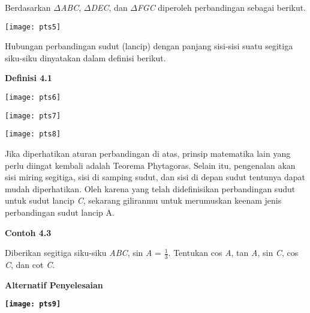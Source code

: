\documentclass[11pt,fleqn]{book} %
\begin{document}
\begin{myEnumerate}
\begin{itemize}
\noindent 

\noindent Berdasarkan $\Delta$\textit{ABC}, $\Delta$\textit{DEC}, dan $\Delta$\textit{FGC }diperoleh perbandingan sebagai berikut.

\noindent 

\noindent \texttt{[image: pts5]}

\noindent 

\noindent Hubungan perbandingan sudut (lancip) dengan panjang sisi-sisi suatu segitiga siku-siku dinyatakan dalam definisi berikut.

\noindent 

\noindent 

\noindent \textbf{Definisi 4.1}

\noindent \textbf{}

\noindent \texttt{[image: pts6]} 

\noindent \texttt{[image: pts7]}

\noindent \texttt{[image: pts8]}

\noindent 

\noindent Jika diperhatikan aturan perbandingan di atas, prinsip matematika lain yang perlu diingat kembali adalah Teorema Phytagoras. Selain itu, pengenalan akan sisi miring segitiga, sisi di samping sudut, dan sisi di depan sudut tentunya dapat mudah diperhatikan. Oleh karena yang telah didefinisikan perbandingan sudut untuk sudut lancip \textit{C}, sekarang giliranmu untuk merumuskan keenam jenis perbandingan sudut lancip A.

\noindent 

\noindent 

\noindent 

\noindent 

\noindent 

\noindent \textbf{Contoh 4.3}

\noindent 

\noindent Diberikan segitiga siku-siku \textit{ABC}, sin \textit{A }= $\frac{1}{3}$. Tentukan cos \textit{A}, tan \textit{A}, sin \textit{C}, cos \textit{C}, dan cot \textit{C}.

\noindent 

\noindent \textbf{Alternatif Penyelesaian}

\noindent \textbf{}

\noindent \textbf{\texttt{[image: pts9]}}


\end{itemize}
\end{myEnumerate}
\end{document}

